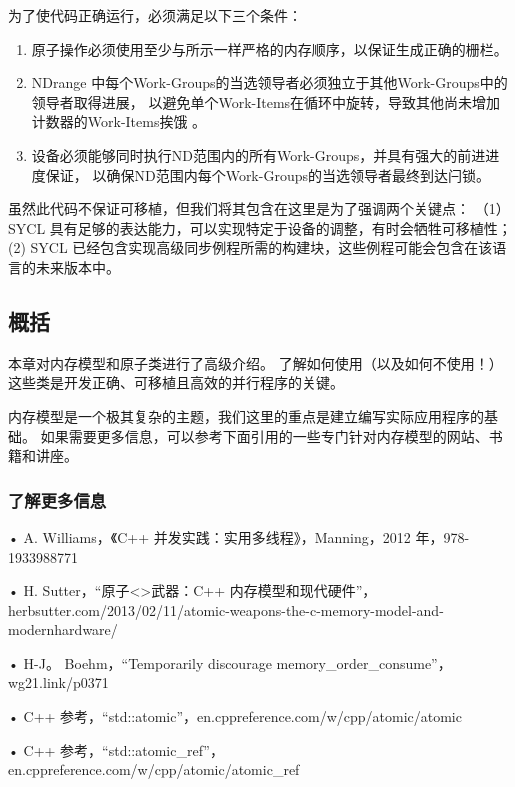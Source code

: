为了使代码正确运行，必须满足以下三个条件：

\begin{enumerate}
	\item 原子操作必须使用至少与所示一样严格的内存顺序，以保证生成正确的栅栏。

	\item NDrange 中每个Work-Groups的当选领导者必须独立于其他Work-Groups中的领导者取得进展，
	以避免单个Work-Items在循环中旋转，导致其他尚未增加计数器的Work-Items挨饿 。

	\item 设备必须能够同时执行ND范围内的所有Work-Groups，并具有强大的前进进度保证，
	以确保ND范围内每个Work-Groups的当选领导者最终到达闩锁。
\end{enumerate}

虽然此代码不保证可移植，但我们将其包含在这里是为了强调两个关键点：
（1）SYCL 具有足够的表达能力，可以实现特定于设备的调整，有时会牺牲可移植性； 
(2) SYCL 已经包含实现高级同步例程所需的构建块，这些例程可能会包含在该语言的未来版本中。

\subsection{概括}
本章对内存模型和原子类进行了高级介绍。 
了解如何使用（以及如何不使用！）这些类是开发正确、可移植且高效的并行程序的关键。

内存模型是一个极其复杂的主题，我们这里的重点是建立编写实际应用程序的基础。 
如果需要更多信息，可以参考下面引用的一些专门针对内存模型的网站、书籍和讲座。

\subsubsection{了解更多信息}
• A. Williams，《C++ 并发实践：实用多线程》，Manning，2012 年，978-1933988771

• H. Sutter，“原子<>武器：C++ 内存模型和现代硬件”，herbsutter.com/2013/02/11/atomic-weapons-the-c-memory-model-and-modernhardware/

• H-J。 Boehm，“Temporarily discourage memory\_order\_consume”，wg21.link/p0371

• C++ 参考，“std::atomic”，en.cppreference.com/w/cpp/atomic/atomic

• C++ 参考，“std::atomic\_ref”，en.cppreference.com/w/cpp/atomic/atomic\_ref